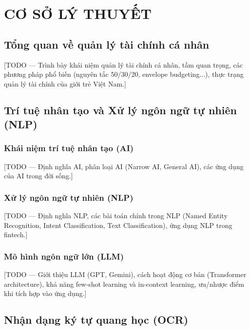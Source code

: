 \chapter{CƠ SỞ LÝ THUYẾT}
\label{ch:theory}

\section{Tổng quan về quản lý tài chính cá nhân}
\label{sec:overview_personal_finance}

[TODO --- Trình bày khái niệm quản lý tài chính cá nhân, tầm quan trọng, các phương pháp phổ biến (nguyên tắc 50/30/20, envelope budgeting...), thực trạng quản lý tài chính của giới trẻ Việt Nam.]

\section{Trí tuệ nhân tạo và Xử lý ngôn ngữ tự nhiên (NLP)}
\label{sec:ai_and_nlp}

\subsection{Khái niệm trí tuệ nhân tạo (AI)}
\label{subsec:ai_concept}

[TODO --- Định nghĩa AI, phân loại AI (Narrow AI, General AI), các ứng dụng của AI trong đời sống.]

\subsection{Xử lý ngôn ngữ tự nhiên (NLP)}
\label{subsec:nlp}

[TODO --- Định nghĩa NLP, các bài toán chính trong NLP (Named Entity Recognition, Intent Classification, Text Classification), ứng dụng NLP trong fintech.]

\subsection{Mô hình ngôn ngữ lớn (LLM)}
\label{subsec:llm}

[TODO --- Giới thiệu LLM (GPT, Gemini), cách hoạt động cơ bản (Transformer architecture), khả năng few-shot learning và in-context learning, ưu/nhược điểm khi tích hợp vào ứng dụng.]

\section{Nhận dạng ký tự quang học (OCR)}
\label{sec:ocr}


